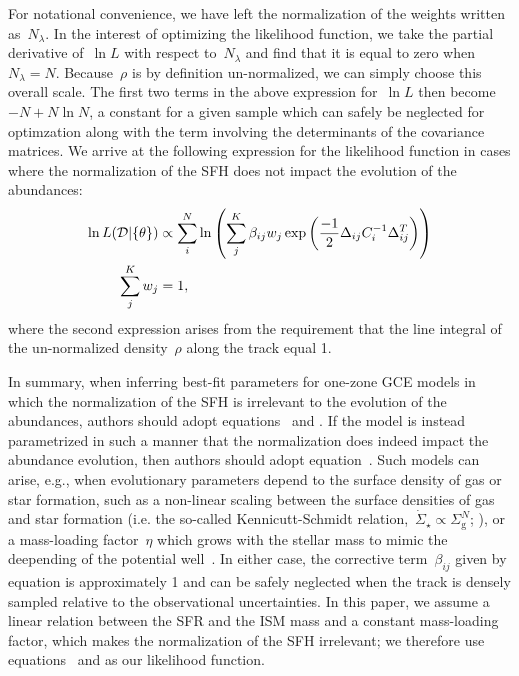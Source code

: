\documentclass[ms.tex]{subfiles}
\begin{document}
For notational convenience, we have left the normalization of the weights
written as~$N_\lambda$.
In the interest of optimizing the likelihood function, we take the partial
derivative of~$\ln L$ with respect to~$N_\lambda$ and find that it is equal to
zero when~$N_\lambda = N$.
Because~$\rho$ is by definition un-normalized, we can simply choose this
overall scale.
The first two terms in the above expression for~$\ln L$ then become
$-N + N \ln N$, a constant for a given sample which can safely be neglected
for optimzation along with the term involving the determinants of the
covariance matrices.
We arrive at the following expression for the likelihood function in cases
where the normalization of the SFH does not impact the evolution of the
abundances:
\begin{subequations}\begin{align}
\ln L(\mathcal{D} | \{\theta\}) &\propto \sum_i^N \ln \left( \sum_j^K \beta_{ij}
w_j \exp\left(\frac{-1}{2}\Delta_{ij} C_i^{-1} \Delta_{ij}^T\right) \right)
\label{eq:lnL_fracweight}
\\
\sum_j^K w_j &= 1,
\label{eq:lnL_fracweightsum}
\end{align}\end{subequations}
where the second expression arises from the requirement that the line integral
of the un-normalized density~$\rho$ along the track equal 1.
\par
In summary, when inferring best-fit parameters for one-zone GCE models in which
the normalization of the SFH is irrelevant to the evolution of the abundances,
authors should adopt equations~ and
.
If the model is instead parametrized in such a manner that the normalization
does indeed impact the abundance evolution, then authors should adopt
equation~.
Such models can arise, e.g., when evolutionary parameters depend to the surface
density of gas or star formation, such as a non-linear scaling between the
surface densities of gas and star formation (i.e. the so-called
Kennicutt-Schmidt relation,~$\dot{\Sigma}_\star \propto \Sigma_\text{g}^N$;
\citealp{Kennicutt1998, delosReyes2019, Kennicutt2021}), or a mass-loading
factor~$\eta$ which grows with the stellar mass to mimic the deepending of
the potential well~\citep[e.g.][]{Conroy2022}.
In either case, the corrective term~$\beta_{ij}$ given by equation
 is approximately 1 and can be safely neglected when
the track is densely sampled relative to the observational uncertainties.
In this paper, we assume a linear relation between the SFR and the ISM mass and
a constant mass-loading factor, which makes the normalization of the SFH
irrelevant; we therefore use equations~ and
 as our likelihood function.
\end{document}
